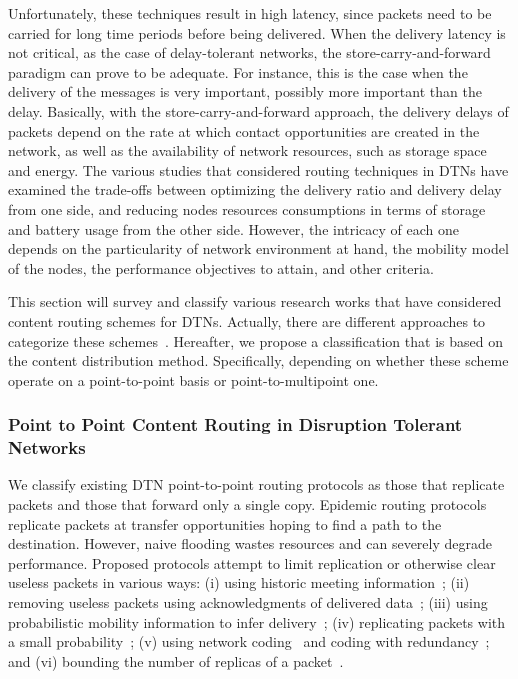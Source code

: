 Unfortunately, these techniques result in high latency, since packets need to be carried for long time periods before being delivered. When the delivery latency is not critical, as
the case of delay-tolerant networks, the store-carry-and-forward paradigm can prove to be adequate. For instance, this is the case when the delivery of the messages is very important, possibly more important than the delay. Basically, with the store-carry-and-forward approach, the delivery delays of packets depend on the rate at which contact opportunities are created in the network, as well as the availability of network resources, such as storage space and energy. The various studies that considered routing techniques in DTNs have examined the trade-offs between optimizing the delivery ratio and delivery delay from one side, and reducing nodes resources consumptions in terms of storage and battery usage from the other side. However, the intricacy of each one depends on the particularity of network environment at hand, the mobility model of the nodes, the performance objectives to attain, and other criteria.

This section will survey and classify various research works that have considered content routing schemes for DTNs. Actually, there are different approaches to categorize these schemes~\cite{Ward:RoutingSurvey, DTNRoutingSurvey06}. Hereafter, we propose a classification that is based on the content distribution method. Specifically, depending on whether these scheme operate on a point-to-point basis or point-to-multipoint one.

\subsubsection{Point to Point Content Routing in Disruption Tolerant Networks}

We classify existing DTN point-to-point routing protocols as those that replicate packets and those that forward only a
single copy. Epidemic routing protocols replicate packets at transfer opportunities hoping to find a path to the destination.
However, naive flooding wastes resources and can severely degrade performance. Proposed protocols attempt to limit
replication or otherwise clear useless packets in various ways: (i) using historic meeting information~\cite{Wearable, MVRouting, Levine:MaxProp}; (ii) removing useless packets using acknowledgments of delivered data~\cite{Levine:MaxProp}; (iii) using probabilistic mobility information to infer
delivery~\cite{Haas:wdtn}; (iv) replicating packets with a small probability~\cite{Tseng:broadcast}; (v) using network coding~\cite{LeBoudec:wdtn} and coding with
redundancy~\cite{Fall:Sigcomm05}; and (vi) bounding the number of replicas of a packet~\cite{Haas:wdtn,akis:wdtn,Vahdat:epidemic}.

